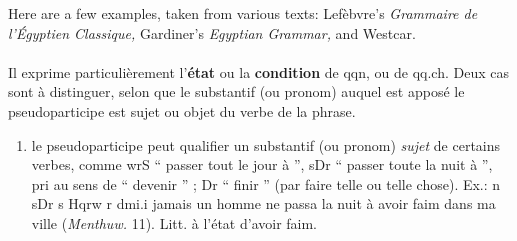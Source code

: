 \documentclass[final]{article}
\def\htimage#1{{#1\relax}}
\begin{document}
Here are a few examples, taken from various texts: Lef\`ebvre's {\it
  Grammaire de l'\'Egyptien Classique,\/} Gardiner's {\it Egyptian
  Grammar,\/} and Westcar.
\vspace{2em}


 \paragraph{} 
 Il exprime particuli\`erement l'{\bf \'etat} ou la {\bf condition} de qqn,
 ou de qq.ch. Deux cas sont \`a distinguer, selon que le substantif (ou
 pronom) auquel est appos\'e le pseudoparticipe est sujet ou objet du
 verbe de la phrase.

 \begin{enumerate}
 \item le pseudoparticipe peut qualifier un substantif (ou pronom) {\em
     sujet\/} de certains verbes, comme 
   \htimage{\eg wrS\/} `` passer tout le jour \`a '', 
 \htimage{\eg sDr\/} `` passer toute la nuit \`a '',  
 \htimage{\eg pri\/} au sens de `` devenir '' ;
 \htimage{\eg Dr\/} `` finir '' (par faire telle ou telle chose).
   Ex.: 
 \htimage{\eg n sDr s Hqrw r dmi.i\/} jamais un homme ne passa la nuit \`a
   avoir faim dans ma ville ({\it Menthuw.\/} 11). Litt. \`a l'\'etat
   d'avoir faim.


\end{enumerate}
\end{document}
